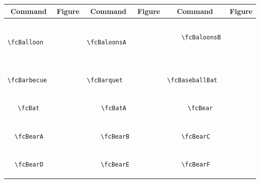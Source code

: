 \documentclass[x11names]{article}
\begin{document}
\begin{table}[H]\centering\begin{tabular}{|c|c|c|c|c|c|}\hline{\bf Command} & {\bf Figure} & {\bf Command} & {\bf Figure} & {\bf Command} & {\bf Figure}\\	\hline	&\multirow{5}{*}{	\fcBalloon	[scale=0.16]} & &\multirow{5}{*}{	\fcBaloonsA	[scale=0.16]} & &\multirow{5}{*}{	\fcBaloonsB	[scale=0.16]}\\	& & & & & \\	& & & & & \\	\verb|	\fcBalloon	| & & \verb|	\fcBaloonsA	| & & \verb|	\fcBaloonsB	| & \\	& & & & & \\	& & & & & \\	& & & & & \\	\hline									
		&\multirow{5}{*}{	\fcBarbecue	[scale=0.16]} & &\multirow{5}{*}{	\fcBarquet	[scale=0.16]} & &\multirow{5}{*}{	\fcBaseballBat	[scale=0.64]}\\	& & & & & \\	& & & & & \\	\verb|	\fcBarbecue	| & & \verb|	\fcBarquet	| & & \verb|	\fcBaseballBat	| & \\	& & & & & \\	& & & & & \\	& & & & & \\	\hline									
		&\multirow{5}{*}{	\fcBat	[scale=0.64]} & &\multirow{5}{*}{	\fcBatA	[scale=0.64]} & &\multirow{5}{*}{	\fcBear	[scale=0.64]}\\	& & & & & \\	& & & & & \\	\verb|	\fcBat	| & & \verb|	\fcBatA	| & & \verb|	\fcBear	| & \\	& & & & & \\	& & & & & \\	& & & & & \\	\hline									
		&\multirow{5}{*}{	\fcBearA	[scale=0.16]} & &\multirow{5}{*}{	\fcBearB	[scale=0.16]} & &\multirow{5}{*}{	\fcBearC	[scale=0.16]}\\	& & & & & \\	& & & & & \\	\verb|	\fcBearA	| & & \verb|	\fcBearB	| & & \verb|	\fcBearC	| & \\	& & & & & \\	& & & & & \\	& & & & & \\	\hline									
		&\multirow{5}{*}{	\fcBearD	[scale=0.16]} & &\multirow{5}{*}{	\fcBearE	[scale=0.16]} & &\multirow{5}{*}{	\fcBearF	[scale=0.16]}\\	& & & & & \\	& & & & & \\	\verb|	\fcBearD	| & & \verb|	\fcBearE	| & & \verb|	\fcBearF	| & \\	& & & & & \\	& & & & & \\	& & & & & \\	\hline									

\end{tabular}
\end{table}
\end{document}
